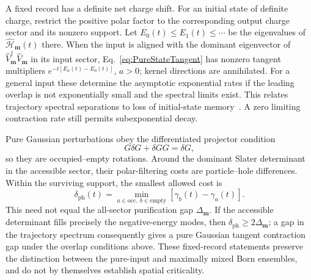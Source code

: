 \documentclass[aps,prb,10pt,twocolumn,superscriptaddress,longbibliography,floatfix]{revtex4-2}
\newcommand{\rec}{\mathbf m}   %
\begin{document}
{A fixed record has a definite net charge shift. For an initial state of definite charge, restrict the positive polar factor to the corresponding output charge sector and its nonzero support. Let $E_0(t)\leq E_1(t)\leq\cdots$ be the eigenvalues of $\hat{\mathcal H}_{\rec}(t)$ there. When the input is aligned with the dominant eigenvector of $\hat V_{\rec}^\dagger\hat V_{\rec}$ in its input sector, Eq.~\eqref{eq:PureStateTangent} has nonzero tangent multipliers $e^{-t[E_a(t)-E_0(t)]}$, $a>0$; kernel directions are annihilated. For a general input these determine the asymptotic exponential rates if the leading overlap is not exponentially small and the spectral limits exist. This relates trajectory spectral separations to loss of initial-state memory~\cite{BulchandaniSondhiChalker2024}. A zero limiting contraction rate still permits subexponential decay.

Pure Gaussian perturbations obey the differentiated projector condition
\begin{equation}
 G\delta G+\delta G G=\delta G,
 \label{eq:PureCovarianceTangent}
\end{equation}
so they are occupied--empty rotations. Around the dominant Slater determinant in the accessible sector, their polar-filtering costs are particle--hole differences. Within the surviving support, the smallest allowed cost is
\begin{equation}
 \delta_{\mathrm{ph}}(t)=
 \min_{a\in\mathrm{occ},\ b\in\mathrm{empty}}
 [\gamma_b(t)-\gamma_a(t)].
 \label{eq:ParticleHoleResponseGap}
\end{equation}
This need not equal the all-sector purification gap $\Delta_{\rec}$. If the accessible determinant fills precisely the negative-energy modes, then $\delta_{\mathrm{ph}}\geq2\Delta_{\rec}$; a gap in the trajectory spectrum consequently gives a pure Gaussian tangent contraction gap under the overlap conditions above. These fixed-record statements preserve the distinction between the pure-input and maximally mixed Born ensembles, and do not by themselves establish spatial criticality.
}
\end{document}
